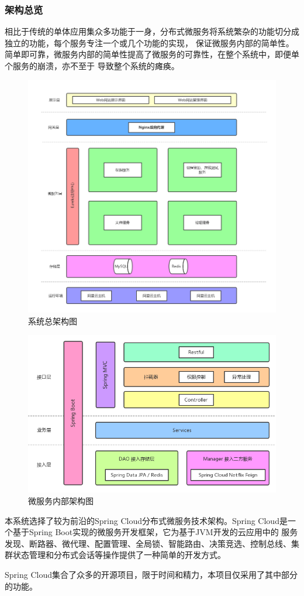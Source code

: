\documentclass[titlepage,UTF8,linespread=1.5]{ctexart}
\begin{document}
\subsubsection{架构总览}
相比于传统的单体应用集众多功能于一身，分布式微服务将系统繁杂的功能切分成独立的功能，每个服务专注一个或几个功能的实现，
保证微服务内部的简单性。简单即可靠，微服务内部的简单性提高了微服务的可靠性，在整个系统中，即便单个服务的崩溃，亦不至于
导致整个系统的瘫痪。\par
\begin{figure}[H]
    \centering
    \includegraphics[width=150mm]{arch-overall.png}
    \caption{系统总架构图}
    \label{fig:arch-overall}
\end{figure}
\begin{figure}[H]
    \centering
    \includegraphics[width=150mm]{arch-microserver.png}
    \caption{微服务内部架构图}
    \label{fig:arch-microserver}
\end{figure}
本系统选择了较为前沿的Spring Cloud分布式微服务技术架构。Spring Cloud是一个基于Spring Boot实现的微服务开发框架，它为基于JVM开发的云应用中的
服务发现、断路器、微代理、配置管理、全局锁、智能路由、决策竞选、控制总线、集群状态管理和分布式会话等操作提供了一种简单的开发方式。\par
Spring Cloud集合了众多的开源项目，限于时间和精力，本项目仅采用了其中部分的功能。\par
\end{document}
